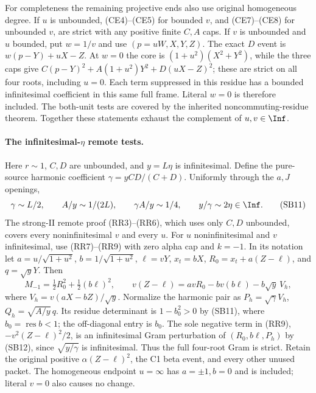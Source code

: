 For completeness the remaining projective ends also use original
homogeneous degree. If $u$ is unbounded, (CE4)--(CE5) for bounded
$v$, and (CE7)--(CE8) for unbounded $v$, are strict with any positive
finite $C,A$ caps. If $v$ is unbounded and $u$ bounded, put
$w=1/v$ and use $(p=uW,X,Y,Z)$. The exact $D$ event is
$w(p-Y)+uX-Z$. At $w=0$ the core is
$(1+u^2)(X^2+Y^2)$, while the three caps give
$C(p-Y)^2+A(1+u^2)Y^2+D(uX-Z)^2$; these are strict on
all four roots, including $u=0$. Each term suppressed in this
residue has a bounded infinitesimal coefficient in this same
full frame. Literal $w=0$ is therefore included. The both-unit
tests are covered by the inherited noncommuting-residue theorem.
Together these statements exhaust the complement of $u,v\in\Inf$.

\paragraph{The infinitesimal-$\eta$ remote tests.}
Here $r\sim1$, $C,D$ are unbounded, and $y=L\eta$ is infinitesimal.
Define the pure-source harmonic coefficient
$\gamma=yCD/(C+D)$. Uniformly through the $a,J$ openings,
\[
 \gamma\sim L/2,\qquad A/y\sim1/(2L),\qquad
 \gamma A/y\sim1/4,\qquad y/\gamma\sim2\eta\in\Inf. \tag{SB11}
\]
The strong-II remote proof (RR3)--(RR6), which uses only $C,D$
unbounded, covers every noninfinitesimal $v$ and every $u$.
For $u$ noninfinitesimal and $v$ infinitesimal, use (RR7)--(RR9)
with zero alpha cap and $k=-1$. In its notation let
$a=u/\sqrt{1+u^2}$, $b=1/\sqrt{1+u^2}$,
$\ell=vY$, $x_t=bX$, $R_0=x_t+a(Z-\ell)$, and $q=\sqrt yY$.
Then
\[
 M_{-1}=\tfrac12R_0^2+\tfrac12(b\ell)^2,\qquad
 v(Z-\ell)=avR_0-bv(b\ell)-b\sqrt y\,V_h,       \tag{SB12}
\]
where $V_h=v(aX-bZ)/\sqrt y$. Normalize the harmonic pair as
$P_h=\sqrt\gamma V_h$, $Q_h=\sqrt{A/y}\,q$. Its residue
determinant is $1-b_0^2>0$ by (SB11), where $b_0=\operatorname{res}b<1$;
the off-diagonal entry is $b_0$. The sole negative term in (RR9),
$-v^2(Z-\ell)^2/2$, is an infinitesimal Gram perturbation of
$(R_0,b\ell,P_h)$ by (SB12), since $\sqrt{y/\gamma}$ is
infinitesimal. Thus the full four-root Gram is strict. Retain the
original positive $\alpha(Z-\ell)^2$, the C1 beta event, and every
other unused packet. The homogeneous endpoint $u=\infty$ has
$a=\pm1,b=0$ and is included; literal $v=0$ also causes no change.


